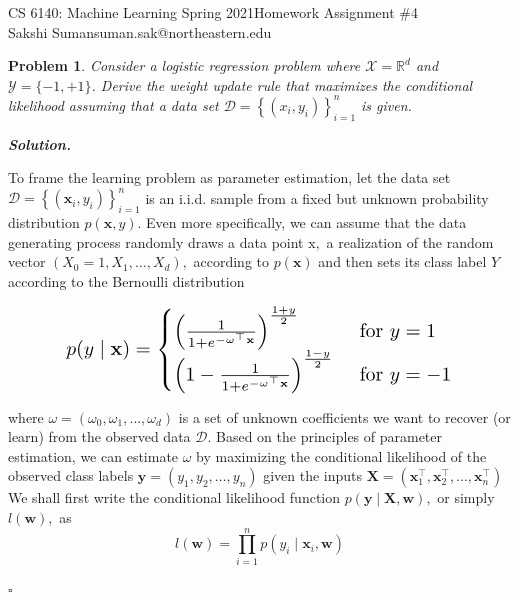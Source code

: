 \documentclass[10pt]{article}
\newtheorem{problem}{Problem}
\newenvironment{solution}[1][\it{Solution}]{\textbf{#1. } }{$\square$}
\begin{document}
\noindent CS 6140: Machine Learning Spring 2021\hfill Homework Assignment \#4\\
Sakshi Suman\hfill suman.sak@northeastern.edu

\hrulefill


\begin{problem}

Consider a logistic regression problem where $\mathcal{X}=\mathbb{R}^{d}$ and $\mathcal{Y}=\{-1,+1\}$. Derive the weight update rule that maximizes the conditional likelihood assuming that a data set $\mathcal{D}=\left\{\left(x_{i}, y_{i}\right)\right\}_{i=1}^{n}$ is given.

\end{problem}
\begin{solution}

To frame the learning problem as parameter estimation, let the data set $\mathcal{D}=\left\{\left(\mathbf{x}_{i}, y_{i}\right)\right\}_{i=1}^{n}$ is an i.i.d. sample from a fixed but unknown probability distribution $p(\mathbf{x}, y) .$ Even more specifically, we can assume that the data generating process randomly draws a data point $\mathrm{x},$ a realization of the random vector $\left(X_{0}=1, X_{1}, \ldots, X_{d}\right),$ according to $p(\mathbf{x})$ and then sets its class label $Y$ according to the Bernoulli distribution

\begin{equation*}
\scalebox{1.4}{
$p(y \mid \mathbf{x}) = 
        \begin{cases}
            \left(\frac{1}{1+e^{-\omega^{\top} \mathbf{x}}}\right)^{\frac{1+y}{2}} &\text{ for } y=1 \\
			  \left(1-\frac{1}{1+e^{-\omega^{\top} \mathbf{x}}}\right)^{\frac{1-y}{2}} &\text{ for } y=-1
        \end{cases}$
        }
    \end{equation*}

where $\omega=\left(\omega_{0}, \omega_{1}, \ldots, \omega_{d}\right)$ is a set of unknown coefficients we want to recover (or learn) from the observed data $\mathcal{D}$. Based on the principles of parameter estimation, we can estimate $\omega$ by maximizing the conditional likelihood of the observed class labels $\mathbf{y}=\left(y_{1}, y_{2}, \ldots, y_{n}\right)$ given the inputs $\mathbf{X}=\left(\mathbf{x}_{1}^{\top}, \mathbf{x}_{2}^{\top}, \ldots, \mathbf{x}_{n}^{\top}\right)$
We shall first write the conditional likelihood function $p(\mathbf{y} \mid \mathbf{X}, \mathbf{w}),$ or simply $l(\mathbf{w}),$ as
$$
l(\mathbf{w})=\prod_{i=1}^{n} p\left(y_{i} \mid \mathbf{x}_{i}, \mathbf{w}\right)
$$


\end{solution}
\end{document}
